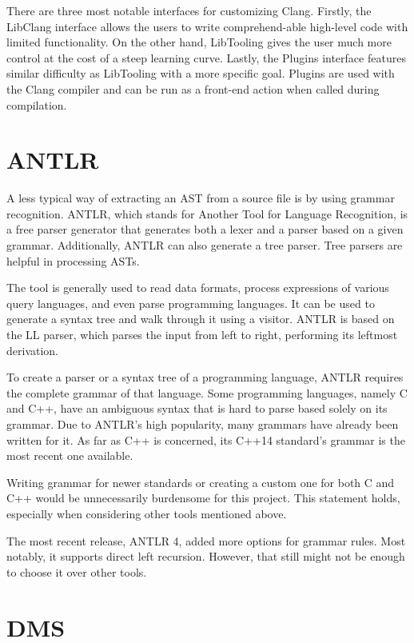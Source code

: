 There are three most notable interfaces for customizing Clang. 
Firstly, the LibClang interface allows the users to write 
comprehend-able high-level code with limited functionality. 
On the other hand, LibTooling gives the user much more control 
at the cost of a steep learning curve. 
Lastly, the Plugins interface features similar difficulty 
as LibTooling with a more specific goal. 
Plugins are used with the Clang compiler and can be run 
as a front-end action when called during compilation.


\section{ANTLR}

A less typical way of extracting an AST from a source file is by using grammar
recognition.
ANTLR, which stands for Another Tool for Language Recognition, is a free 
parser generator that generates both a lexer and a parser based on 
a given grammar.
Additionally, ANTLR can also generate a tree parser.
Tree parsers are helpful in processing ASTs.

The tool is generally used to read data formats, process expressions 
of various query languages, and even parse programming languages.
It can be used to generate a syntax tree and walk through it using a visitor.
ANTLR is based on the LL parser, which parses the input from left to right, 
performing its leftmost derivation.

To create a parser or a syntax tree of a programming language, ANTLR requires 
the complete grammar of that language.
Some programming languages, namely C and C++, have an ambiguous syntax that 
is hard to parse based solely on its grammar.
Due to ANTLR's high popularity, many grammars have already been written 
for it.
As far as C++ is concerned, its C++14 standard's grammar is the most recent 
one available.

Writing grammar for newer standards or creating a custom one for both C and 
C++ would be unnecessarily burdensome for this project.
This statement holds, especially when considering other tools mentioned above.

The most recent release, ANTLR 4, added more options for grammar rules.
Most notably, it supports direct left recursion.
However, that still might not be enough to choose it over other tools.


\section{DMS}

